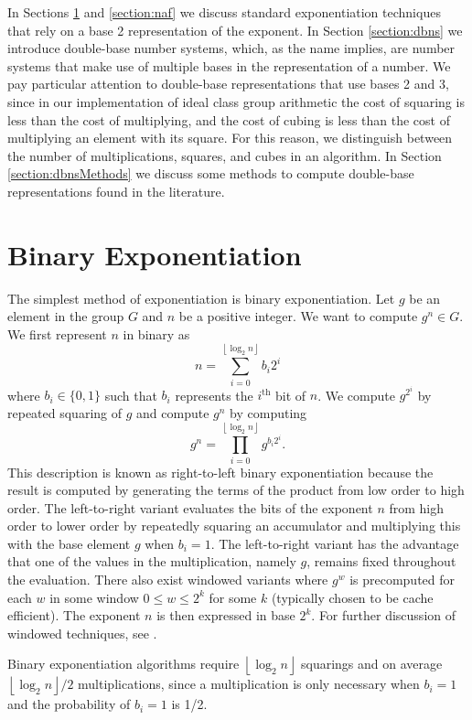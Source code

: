 \documentclass{ucalgthes1}
\theoremstyle{definition}
\newcommand{\floor}[1]{\left\lfloor #1 \right\rfloor}
\begin{document}
In Sections \ref{section:binaryExp} and \ref{section:naf} we discuss standard exponentiation techniques that rely on a base 2 representation of the exponent.  In Section \ref{section:dbns} we introduce double-base number systems, which, as the name implies, are number systems that make use of multiple bases in the representation of a number.  We pay particular attention to double-base representations that use bases 2 and 3, since in our implementation of ideal class group arithmetic the cost of squaring is less than the cost of multiplying, and the cost of cubing is less than the cost of multiplying an element with its square. For this reason, we distinguish between the number of multiplications, squares, and cubes in an algorithm. In Section \ref{section:dbnsMethods} we discuss some methods to compute double-base representations found in the literature.  


\bigbreak
\section{Binary Exponentiation}
\label{section:binaryExp}
The simplest method of exponentiation is binary exponentiation.  Let $g$ be an element in the group $G$ and $n$ be a positive integer.  We want to compute $g^n \in G$.  We first represent $n$ in binary as
\[
	n = \sum_{i=0}^{\floor{\log_2 n}} b_i 2^i
\]
where $b_i \in \{0, 1\}$ such that $b_i$ represents the $i^{\textrm{th}}$ bit of $n$.   We compute $g^{2^i}$ by repeated squaring of $g$ and compute $g^n$ by computing
\[
	g^n = \prod_{i=0}^{\floor{\log_2 n}} g^{b_i 2^i}.
\]
This description is known as right-to-left binary exponentiation because the result is computed by generating the terms of the product from low order to high order.  The left-to-right variant evaluates the bits of the exponent $n$ from high order to lower order by repeatedly squaring an accumulator and multiplying this with the base element $g$ when $b_i = 1$.  The left-to-right variant has the advantage that one of the values in the multiplication, namely $g$, remains fixed throughout the evaluation.  There also exist windowed variants where $g^w$ is precomputed for each $w$ in some window $0 \le w \le 2^k$ for some $k$ (typically chosen to be cache efficient). The exponent $n$ is then expressed in base $2^k$.  For further discussion of windowed techniques, see \cite{Cohen2006}.

Binary exponentiation algorithms require $\floor{\log_2 n}$ squarings and on average $\floor{\log_2 n}/2$ multiplications, since a multiplication is only necessary when $b_i = 1$ and the probability of $b_i = 1$ is 1/2.
\end{document}

